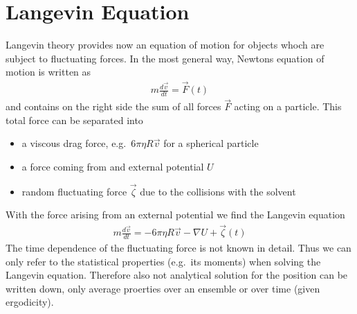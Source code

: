 \documentclass[letterpaper,10pt,english]{sphinxmanual}
\begin{document}
\section{Langevin Equation}
\label{\detokenize{notebooks/L16/1_langevin:Langevin-Equation}}
\sphinxAtStartPar
Langevin theory provides now an equation of motion for objects whoch are subject to fluctuating forces. In the most general way, Newtons equation of motion is written as
\begin{equation*}
\begin{split}m\frac{d\vec{v}}{dt}=\vec{F}(t)\end{split}
\end{equation*}
\sphinxAtStartPar
and contains on the right side the sum of all forces \(\vec{F}\) acting on a particle. This total force can be separated into
\begin{itemize}
\item {} 
\sphinxAtStartPar
a viscous drag force, e.g. \(6\pi \eta R \vec{v}\) for a spherical particle

\item {} 
\sphinxAtStartPar
a force coming from and external potential \(U\)

\item {} 
\sphinxAtStartPar
random fluctuating force \(\vec{\zeta}\) due to the collisions with the solvent

\end{itemize}

\sphinxAtStartPar
With the force arising from an external potential we find the Langevin equation
\begin{equation*}
\begin{split}m\frac{d\vec{v}}{dt}=-6\pi \eta R \vec{v}-\nabla U +\vec{\zeta}(t) \tag{Langevin Equation}\end{split}
\end{equation*}
\sphinxAtStartPar
The time dependence of the fluctuating force is not known in detail. Thus we can only refer to the statistical properties (e.g. its moments) when solving the Langevin equation. Therefore also not analytical solution for the position can be written down, only average proerties over an ensemble or over time (given ergodicity).
\end{document}
